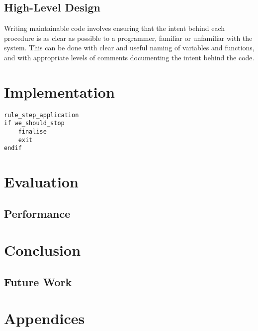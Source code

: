 \documentclass{UoYCSproject}
\begin{document}
\section{High-Level Design}
Writing maintainable code involves ensuring that the intent behind each procedure is as clear as possible to a programmer, familiar or unfamiliar with the system. This can be done with clear and useful naming of variables and functions, and with appropriate levels of comments documenting the intent behind the code.


 
\chapter{Implementation}


\begin{lstlisting}[label=code:breakpoint_1, caption=Pseudocode of breakpoints]
rule_step_application
if we_should_stop
	finalise
	exit
endif
\end{lstlisting}


\chapter{Evaluation}
\section{Performance}


\chapter{Conclusion}
\section{Future Work}




\chapter{Appendices}
\end{document}
